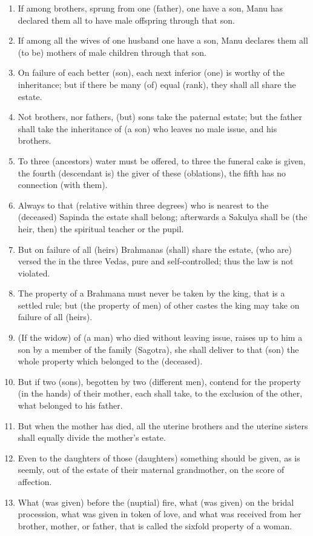 \begin{enumerate}
\item If among brothers, sprung from one (father), one have a son, Manu has declared them all to have male offspring through that son.
\item If among all the wives of one husband one have a son, Manu declares them all (to be) mothers of male children through that son.
\item On failure of each better (son), each next inferior (one) is worthy of the inheritance; but if there be many (of) equal (rank), they shall all share the estate.
\item Not brothers, nor fathers, (but) sons take the paternal estate; but the father shall take the inheritance of (a son) who leaves no male issue, and his brothers.
\item To three (ancestors) water must be offered, to three the funeral cake is given, the fourth (descendant is) the giver of these (oblations), the fifth has no connection (with them).
\item Always to that (relative within three degrees) who is nearest to the (deceased) Sapinda the estate shall belong; afterwards a Sakulya shall be (the heir, then) the spiritual teacher or the pupil.
\item But on failure of all (heirs) Brahmanas (shall) share the estate, (who are) versed the in the three Vedas, pure and self-controlled; thus the law is not violated.
\item The property of a Brahmana must never be taken by the king, that is a settled rule; but (the property of men) of other castes the king may take on failure of all (heirs).
\item (If the widow) of (a man) who died without leaving issue, raises up to him a son by a member of the family (Sagotra), she shall deliver to that (son) the whole property which belonged to the (deceased).
\item But if two (sons), begotten by two (different men), contend for the property (in the hands) of their mother, each shall take, to the exclusion of the other, what belonged to his father.
\item But when the mother has died, all the uterine brothers and the uterine sisters shall equally divide the mother's estate.
\item Even to the daughters of those (daughters) something should be given, as is seemly, out of the estate of their maternal grandmother, on the score of affection.
\item What (was given) before the (nuptial) fire, what (was given) on the bridal procession, what was given in token of love, and what was received from her brother, mother, or father, that is called the sixfold property of a woman.

\end{enumerate}
